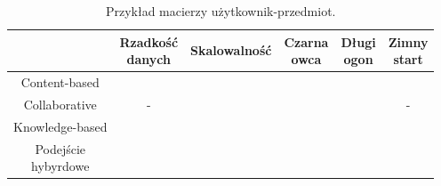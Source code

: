 \begin{table}[h]
\centering
\caption{Przykład macierzy użytkownik-przedmiot.}
\begin{tabular}{|c|c|c|c|c|c|}
\hline
&
\specialcell{Rzadkość\\danych} &
Skalowalność &
\specialcell{Czarna\\owca} &
\specialcell{Długi\\ogon} &
\specialcell{Zimny\\start}
\\
\hline
  
Content-based &
 &
 &
 &
 &

\\
\hline
  
Collaborative &
- &
 &
 &
 &
-
\\
\hline

Knowledge-based &
 &
 &
 &
 &

\\
\hline

\specialcell{Podejście\\hybyrdowe} &
 &
 &
 &
 &

\\
\hline
\end{tabular} 
\label{tabelaMetProblem}
\end{table}
